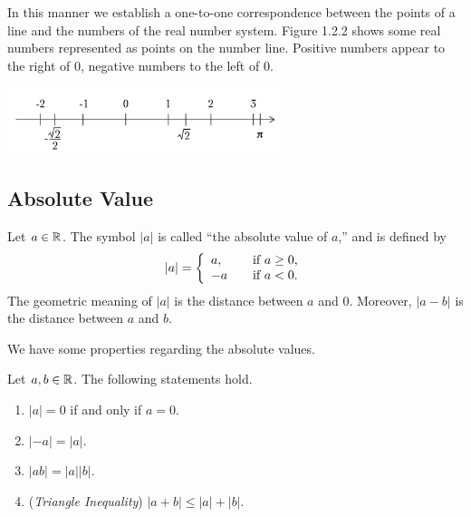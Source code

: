 \documentclass[11pt]{book}
\begin{document}
In this manner we establish a one-to-one correspondence between the points of a line and the numbers of the real number system. Figure 1.2.2 shows some real numbers represented as points on the number line. Positive numbers appear to the right of $0$, negative numbers to the left of $0$.

\begin{center}
    \includegraphics[width=0.6\textwidth]{number_line_example.JPG}
\end{center}

\subsection*{Absolute Value}

Let $a\in\mathbb{R}$. The symbol $|a|$ is called ``the absolute value of $a$,'' and is defined by \vspace*{0.5em} \begin{equation*}
    |a|=\left\{\begin{array}{ll}a,&\quad\text{if $a\geq0$,}\\-a&\quad\text{if $a<0$.}\end{array}\right.\\[0.5em]
\end{equation*} The geometric meaning of $|a|$ is the distance between $a$ and $0$. Moreover, $|a-b|$ is the distance between $a$ and $b$.

We have some properties regarding the absolute values. 

\begin{theorem}
    Let $a, b\in\mathbb{R}$. The following statements hold.
    \begin{enumerate}
        \item $|a|=0$ if and only if $a=0$.
        \item $|-a|=|a|$.
        \item $|ab|=|a||b|$.
        \item (\textit{Triangle Inequality}) $|a+b|\leq|a|+|b|$.
    \end{enumerate}
\end{theorem}
\end{document}
